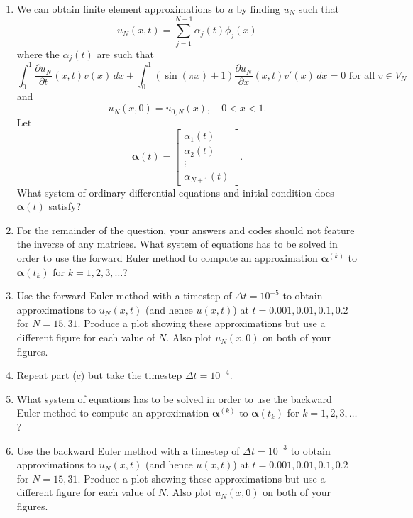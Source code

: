 \begin{enumerate}
\item We can obtain finite element approximations to $u$ by finding $u_N$ such that
\[
u_N(x,t)=\sum_{j=1}^{N+1}\alpha_j(t)\phi_j(x)
\]
where the $\alpha_j(t)$ are such that
\[
\int_0^1\frac{\partial u_N}{\partial t}(x,t)v(x)\,dx+\int_0^1(\sin(\pi x)+1)\frac{\partial u_N}{\partial x}(x,t)v'(x)\,dx=0\mbox{ for all }v\in V_N
\]
and
\[
u_N(x,0)=u_{0,N}(x),\quad 0<x<1.
\]
Let
\[
\boldsymbol{\alpha}(t)=\left[\begin{array}{c}\alpha_1(t) \\ \alpha_2(t) \\ \vdots \\ \alpha_{N+1}(t)\end{array}\right].
\]
What system of ordinary differential equations and initial condition does $\boldsymbol{\alpha}(t)$ satisfy?

\vspace*{1em}
\item For the remainder of the question, your answers and codes should not feature the inverse of any matrices. What system of equations has to be solved in order to use the forward Euler method to compute an approximation $\boldsymbol{\alpha}^{(k)}$ to $\boldsymbol{\alpha}(t_k)$ for $k=1,2,3,\ldots$?

\vspace*{1em}
\item Use the forward Euler method with a timestep of $\Delta t=10^{-5}$ to obtain approximations to $u_N(x,t)$ (and hence $u(x,t)$) at $t=0.001,0.01,0.1,0.2$ for $N=15,31$. Produce a plot showing these approximations but use a different figure for each value of $N$. Also plot $u_N(x,0)$ on both of your figures.

\vspace*{1em}
\item Repeat part (c) but take the timestep $\Delta t=10^{-4}$.

\vspace*{1em}
\item What system of equations has to be solved in order to use the backward Euler method to compute an approximation $\boldsymbol{\alpha}^{(k)}$ to $\boldsymbol{\alpha}(t_k)$ for $k=1,2,3,\ldots$?

\vspace*{1em}
\item Use the backward Euler method with a timestep of $\Delta t=10^{-3}$ to obtain approximations to $u_N(x,t)$ (and hence $u(x,t)$) at $t=0.001,0.01,0.1,0.2$ for $N=15,31$. Produce a plot showing these approximations but use a different figure for each value of $N$. Also plot $u_N(x,0)$ on both of your figures.
\end{enumerate}


